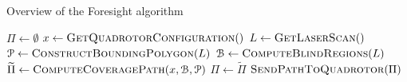 \begin{algorithm}[h!]
    \caption{Overview of the Foresight algorithm}
    \label{algo:overview}
    \begin{algorithmic}[1]
        \setcounter{ALC@line}{0}
        \STATE $\Pi \leftarrow \emptyset$
        \STATE $x \leftarrow {\textsc{GetQuadrotorConfiguration}}()$
        \STATE $L \leftarrow {\textsc{GetLaserScan}}()$
        \STATE ${{\mathcal{P}}} \leftarrow {\textsc{ConstructBoundingPolygon}}(L)$
        \STATE ${{\mathcal{B}}} \leftarrow {\textsc{ComputeBlindRegions}}(L)$
        \STATE $\widetilde{\Pi} \leftarrow
        {\textsc{ComputeCoveragePath}}(x, {{\mathcal{B}}}, {{\mathcal{P}}})$
            \STATE $\Pi \leftarrow \widetilde{\Pi}$
        \ENDIF
        \STATE ${\textsc{SendPathToQuadrotor}}(\Pi)$
        \ENDWHILE
    \end{algorithmic}
\end{algorithm}

%

